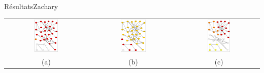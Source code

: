 \documentclass{beamer}
\begin{document}
\begin{frame}{Résultats}{Zachary}
	\begin{center}
		\begin{tabular}[h]{ccc}
		\includegraphics[width=0.30\textwidth]{new_plots/za-m1}&
		\includegraphics[width=0.30\textwidth]{new_plots/za-sp-ge}&
		\includegraphics[width=0.30\textwidth]{new_plots/za-m2}
		\\
		(a) & (b) & (c)
		\end{tabular}
	\end{center}
\end{frame}
\end{document}
